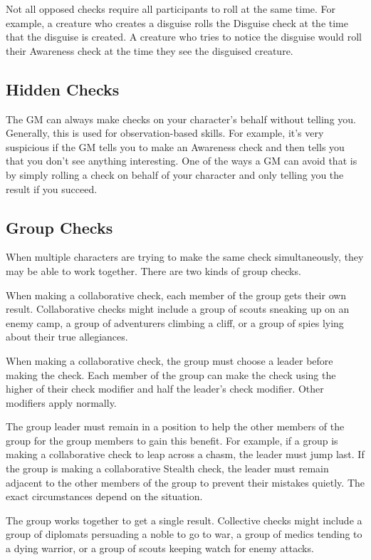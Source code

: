         Not all opposed checks require all participants to roll at the same time.
        For example, a creature who creates a disguise rolls the Disguise check at the time that the disguise is created.
        A creature who tries to notice the disguise would roll their Awareness check at the time they see the disguised creature.

    \subsection{Hidden Checks}
        The GM can always make checks on your character's behalf without telling you.
        Generally, this is used for observation-based skills.
        For example, it's very suspicious if the GM tells you to make an Awareness check and then tells you that you don't see anything interesting.
        One of the ways a GM can avoid that is by simply rolling a check on behalf of your character and only telling you the result if you succeed.

    \subsection{Group Checks}
        When multiple characters are trying to make the same check simultaneously, they may be able to work together.
        There are two kinds of group checks.

         When making a collaborative check, each member of the group gets their own result. Collaborative checks might include a group of scouts sneaking up on an enemy camp, a group of adventurers climbing a cliff, or a group of spies lying about their true allegiances.

        When making a collaborative check, the group must choose a leader before making the check.
        Each member of the group can make the check using the higher of their check modifier and half the leader's check modifier. Other modifiers apply normally.

        The group leader must remain in a position to help the other members of the group for the group members to gain this benefit. For example, if a group is making a collaborative check to leap across a chasm, the leader must jump last. If the group is making a collaborative Stealth check, the leader must remain adjacent to the other members of the group to prevent their mistakes quietly. The exact circumstances depend on the situation.

         The group works together to get a single result. Collective checks might include a group of diplomats persuading a noble to go to war, a group of medics tending to a dying warrior, or a group of scouts keeping watch for enemy attacks.


